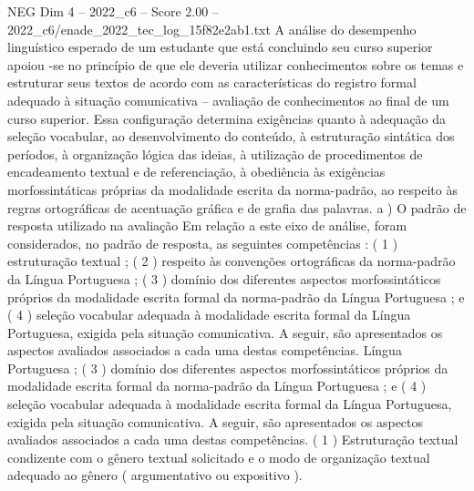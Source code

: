 \begin{textsample}{NEG Dim 4 – 2022\_c6 – Score 2.00 – 2022\_c6/enade\_2022\_tec\_log\_15f82e2ab1.txt}
A análise do desempenho linguístico esperado de um estudante que está concluindo seu curso superior apoiou -se no princípio de que ele deveria utilizar conhecimentos sobre os temas e estruturar seus textos de acordo com as características do registro formal adequado à situação comunicativa – avaliação de conhecimentos ao final de um curso superior.
Essa configuração determina exigências quanto à adequação da seleção vocabular, ao desenvolvimento do conteúdo, à estruturação sintática dos períodos, à organização lógica das ideias, à utilização de procedimentos de encadeamento textual e de referenciação, à obediência às exigências morfossintáticas próprias da modalidade escrita da norma-padrão, ao respeito às regras ortográficas de acentuação gráfica e de grafia das palavras. a ) O padrão de resposta utilizado na avaliação Em relação a este eixo de análise, foram considerados, no padrão de resposta, as seguintes competências : ( 1 ) estruturação textual ; ( 2 ) respeito às convenções ortográficas da norma-padrão da Língua Portuguesa ; ( 3 ) domínio dos diferentes aspectos morfossintáticos próprios da modalidade escrita formal da norma-padrão da Língua Portuguesa ; e ( 4 ) seleção vocabular adequada à modalidade escrita formal da Língua Portuguesa, exigida pela situação comunicativa.
A seguir, são apresentados os aspectos avaliados associados a cada uma destas competências.
Língua Portuguesa ; ( 3 ) domínio dos diferentes aspectos morfossintáticos próprios da modalidade escrita formal da norma-padrão da Língua Portuguesa ; e ( 4 ) seleção vocabular adequada à modalidade escrita formal da Língua Portuguesa, exigida pela situação comunicativa.
A seguir, são apresentados os aspectos avaliados associados a cada uma destas competências. ( 1 ) Estruturação textual condizente com o gênero textual solicitado e o modo de organização textual adequado ao gênero ( argumentativo ou expositivo ).

\end{textsample}
